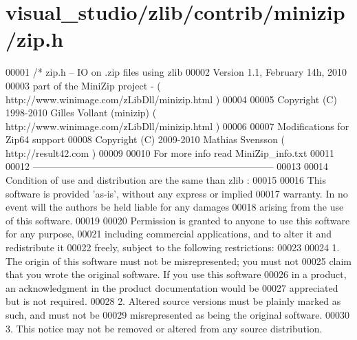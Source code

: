 \hypertarget{visual__studio_2zlib_2contrib_2minizip_2zip_8h_source}{}\section{visual\+\_\+studio/zlib/contrib/minizip/zip.h}
\label{visual__studio_2zlib_2contrib_2minizip_2zip_8h_source}

\begin{DoxyCode}
00001 \textcolor{comment}{/* zip.h -- IO on .zip files using zlib}
00002 \textcolor{comment}{   Version 1.1, February 14h, 2010}
00003 \textcolor{comment}{   part of the MiniZip project - ( http://www.winimage.com/zLibDll/minizip.html )}
00004 \textcolor{comment}{}
00005 \textcolor{comment}{         Copyright (C) 1998-2010 Gilles Vollant (minizip) ( http://www.winimage.com/zLibDll/minizip.html )}
00006 \textcolor{comment}{}
00007 \textcolor{comment}{         Modifications for Zip64 support}
00008 \textcolor{comment}{         Copyright (C) 2009-2010 Mathias Svensson ( http://result42.com )}
00009 \textcolor{comment}{}
00010 \textcolor{comment}{         For more info read MiniZip\_info.txt}
00011 \textcolor{comment}{}
00012 \textcolor{comment}{         ---------------------------------------------------------------------------}
00013 \textcolor{comment}{}
00014 \textcolor{comment}{   Condition of use and distribution are the same than zlib :}
00015 \textcolor{comment}{}
00016 \textcolor{comment}{  This software is provided 'as-is', without any express or implied}
00017 \textcolor{comment}{  warranty.  In no event will the authors be held liable for any damages}
00018 \textcolor{comment}{  arising from the use of this software.}
00019 \textcolor{comment}{}
00020 \textcolor{comment}{  Permission is granted to anyone to use this software for any purpose,}
00021 \textcolor{comment}{  including commercial applications, and to alter it and redistribute it}
00022 \textcolor{comment}{  freely, subject to the following restrictions:}
00023 \textcolor{comment}{}
00024 \textcolor{comment}{  1. The origin of this software must not be misrepresented; you must not}
00025 \textcolor{comment}{     claim that you wrote the original software. If you use this software}
00026 \textcolor{comment}{     in a product, an acknowledgment in the product documentation would be}
00027 \textcolor{comment}{     appreciated but is not required.}
00028 \textcolor{comment}{  2. Altered source versions must be plainly marked as such, and must not be}
00029 \textcolor{comment}{     misrepresented as being the original software.}
00030 \textcolor{comment}{  3. This notice may not be removed or altered from any source distribution.}

\end{DoxyCode}
